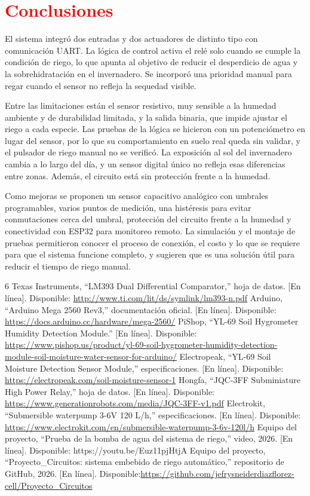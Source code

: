 \documentclass[conference]{IEEEtran}
\let\oldsection\section
\renewcommand{\section}[1]{\oldsection{\textcolor{red}{#1}}}
\begin{document}
\section{Conclusiones}
El sistema integró dos entradas y dos actuadores de distinto tipo con comunicación UART. La lógica de control activa el relé solo cuando se cumple la condición de riego, lo que apunta al objetivo de reducir el desperdicio de agua y la sobrehidratación en el invernadero. Se incorporó una prioridad manual para regar cuando el sensor no refleja la sequedad visible.

Entre las limitaciones están el sensor resistivo, muy sensible a la humedad ambiente y de durabilidad limitada, y la salida binaria, que impide ajustar el riego a cada especie. Las pruebas de la lógica se hicieron con un potenciómetro en lugar del sensor, por lo que su comportamiento en suelo real queda sin validar, y el pulsador de riego manual no se verificó. La exposición al sol del invernadero cambia a lo largo del día, y un sensor digital único no refleja esas diferencias entre zonas. Además, el circuito está sin protección frente a la humedad.

Como mejoras se proponen un sensor capacitivo analógico con umbrales programables, varios puntos de medición, una histéresis para evitar conmutaciones cerca del umbral, protección del circuito frente a la humedad y conectividad con ESP32 para monitoreo remoto. La simulación y el montaje de pruebas permitieron conocer el proceso de conexión, el costo y lo que se requiere para que el sistema funcione completo, y sugieren que es una solución útil para reducir el tiempo de riego manual.

\begin{thebibliography}{6}
 Texas Instruments, ``LM393 Dual Differential Comparator,'' hoja de datos. [En línea]. Disponible: \url{http://www.ti.com/lit/ds/symlink/lm393-n.pdf}
 Arduino, ``Arduino Mega 2560 Rev3,'' documentación oficial. [En línea]. Disponible: \url{https://docs.arduino.cc/hardware/mega-2560/}
 PiShop, ``YL-69 Soil Hygrometer Humidity Detection Module.'' [En línea]. Disponible: \url{https://www.pishop.us/product/yl-69-soil-hygrometer-humidity-detection-module-soil-moisture-water-sensor-for-arduino/}
 Electropeak, ``YL-69 Soil Moisture Detection Sensor Module,'' especificaciones. [En línea]. Disponible: \url{https://electropeak.com/soil-moisture-sensor-1}
 Hongfa, ``JQC-3FF Subminiature High Power Relay,'' hoja de datos. [En línea]. Disponible: \url{https://www.generationrobots.com/media/JQC-3FF-v1.pdf}
 Electrokit, ``Submersible waterpump 3-6V 120 L/h,'' especificaciones. [En línea]. Disponible: \url{https://www.electrokit.com/en/submersible-waterpump-3-6v-120l/h}
 Equipo del proyecto, ``Prueba de la bomba de agua del sistema de riego,'' video, 2026. [En línea]. Disponible: https://youtu.be/Euz11pjHtjA
 Equipo del proyecto, ``Proyecto\_Circuitos: sistema embebido de riego automático,'' repositorio de GitHub, 2026. [En línea]. Disponible:\url{https://github.com/jefrysneiderdiazflorez-cell/Proyecto_Circuitos}
\end{thebibliography}
\end{document}
